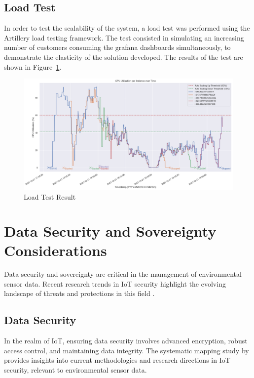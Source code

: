 \documentclass[12pt,oneside]{book} %
\begin{document}
\newpage
\subsection{Load Test}
In order to test the scalability of the system, a load test was performed using
the Artillery load testing framework. The test consisted in simulating an
increasing number of customers consuming the grafana dashboards simultaneously,
to demonstrate the elasticity of the solution developed. The results of the
test are shown in Figure~\ref{fig:load-test-result}.

\begin{figure}[H]
    \centering
    \includegraphics[width=1\linewidth]{images/autoscaling-test.png}
    \caption{Load Test Result}\label{fig:load-test-result}
\end{figure}

\newpage

\newpage
\section{Data Security and Sovereignty Considerations}
Data security and sovereignty are critical in the management of environmental
sensor data. Recent research trends in IoT security highlight the evolving
landscape of threats and protections in this field
\cite{CurrentResearchIoTSecurity2020}.

\subsection{Data Security}
In the realm of IoT, ensuring data security involves advanced encryption,
robust access control, and maintaining data integrity. The systematic mapping
study by \citeauthor{CurrentResearchIoTSecurity2020} provides insights into
current methodologies and research directions in IoT security, relevant to
environmental sensor data.
\end{document}

